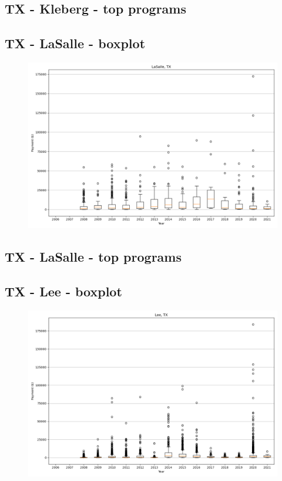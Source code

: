 \subsection*{TX - Kleberg - top programs}

\newpage
\subsection*{TX - LaSalle - boxplot}
\begin{figure}[h]
\centering
\includegraphics[width=7in]{../output/boxplots/counties/LaSalle-TX_boxplot.png}
\end{figure}


\subsection*{TX - LaSalle - top programs}

\newpage
\subsection*{TX - Lee - boxplot}
\begin{figure}[h]
\centering
\includegraphics[width=7in]{../output/boxplots/counties/Lee-TX_boxplot.png}
\end{figure}


